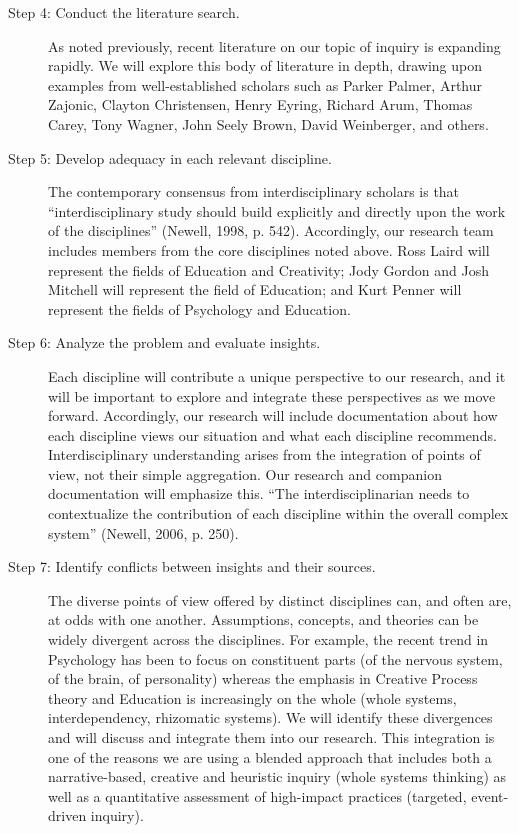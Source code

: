 \documentclass[letterpaper,10pt,headsepline]{scrreprt}
\begin{document}
\begin{description}
\item[Step 4: Conduct the literature search.] As noted previously, recent
  literature on our topic of inquiry is expanding rapidly. We will explore
  this body of literature in depth, drawing upon examples from
  well-established scholars such as Parker Palmer, Arthur Zajonic, Clayton
  Christensen, Henry Eyring, Richard Arum, Thomas Carey, Tony Wagner, John
  Seely Brown, David Weinberger, and others.

\item[Step 5: Develop adequacy in each relevant discipline.] The contemporary
  consensus from interdisciplinary scholars is that ``interdisciplinary study
  should build explicitly and directly upon the work of the disciplines''
  (Newell, 1998, p. 542). Accordingly, our research team includes members from
  the core disciplines noted above. Ross Laird will represent the fields of
  Education and Creativity; Jody Gordon and Josh Mitchell will represent the
  field of Education; and Kurt Penner will represent the fields of Psychology
  and Education.

\item[Step 6: Analyze the problem and evaluate insights.] Each
  discipline will contribute a unique perspective to our research, and it will
  be important to explore and integrate these perspectives as we move forward.
  Accordingly, our research will include documentation about how each
  discipline views our situation and what each discipline recommends.
  Interdisciplinary understanding arises from the integration of points of
  view, not their simple aggregation. Our research and companion documentation
  will emphasize this. ``The interdisciplinarian needs to contextualize the
  contribution of each discipline within the overall complex system'' (Newell,
  2006, p. 250).

\item[Step 7: Identify conﬂicts between insights and their sources.] The
  diverse points of view offered by distinct disciplines can, and often are,
  at odds with one another. Assumptions, concepts, and theories can be widely
  divergent across the disciplines. For example, the recent trend in
  Psychology has been to focus on constituent parts (of the nervous system, of
  the brain, of personality) whereas the emphasis in Creative Process theory
  and Education is increasingly on the whole (whole systems, interdependency,
  rhizomatic systems). We will identify these divergences and will discuss and
  integrate them into our research. This integration is one of the reasons we
  are using a blended approach that includes both a narrative-based, creative
  and heuristic inquiry (whole systems thinking) as well as a quantitative
  assessment of high-impact practices (targeted, event-driven inquiry).


\end{description}
\end{document}
